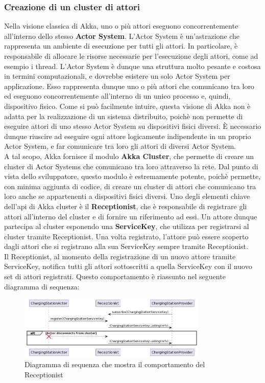 \subsubsection{Creazione di un cluster di attori}
Nella visione classica di Akka, uno o più attori eseguono concorrentemente all'interno dello stesso \textbf{Actor System}.
L'Actor System è un'astrazione che rappresenta un ambiente di esecuzione per tutti gli attori. In particolare, è responsabile di allocare le risorse necessarie per l'esecuzione degli attori, come ad esempio i thread.
L'Actor System è dunque una struttura molto pesante e costosa in termini computazionali, e dovrebbe esistere un solo Actor System per applicazione.
Esso rappresenta dunque uno o più attori che comunicano tra loro ed eseguono concorrentemente all'interno di un unico processo e, quindi, dispositivo fisico.
Come si può facilmente intuire, questa visione di Akka non è adatta per la realizzazione di un sistema distribuito, poichè non permette di eseguire attori di uno stesso Actor System su dispositivi fisici diversi. È necessario dunque
riuscire ad eseguire ogni attore logicamente indipendente in un proprio Actor System, e far comunicare tra loro gli attori di diversi Actor System.\\
A tal scopo, Akka fornisce il modulo \textbf{Akka Cluster}, che permette di creare un cluster di Actor Systems che comunicano tra loro attraverso la rete.
Dal punto di vista dello sviluppatore, questo modulo è estremamente potente, poichè permette, con minima aggiunta di codice, di creare un cluster di attori che comunicano tra loro anche se appartenenti a dispositivi fisici diversi.
Uno degli elementi chiave dell'api di Akka cluster è il \textbf{Receptionist}, che è responsabile di registrare gli attori all'interno del cluster e di fornire un riferimento ad essi.
Un attore dunque partecipa al cluster esponendo una \textbf{ServiceKey}, che utilizza per registrarsi al cluster tramite Receptionist. Una volta registrato, l'attore può essere scoperto dagli attori che si registrano alla sua ServiceKey sempre tramite Receptionist.\\
Il Receptionist, al momento della registrazione di un nuovo attore tramite ServiceKey, notifica tutti gli attori sottoscritti a quella ServiceKey con il nuovo set di attori registrati.
Questo comportamento è riassunto nel seguente diagramma di sequenza:\\

\begin{figure}[H]
      \centering
      \includegraphics[width=0.8\textwidth]{images/cluster.png}
      \caption{Diagramma di sequenza che mostra il comportamento del Receptionist}
\end{figure}

